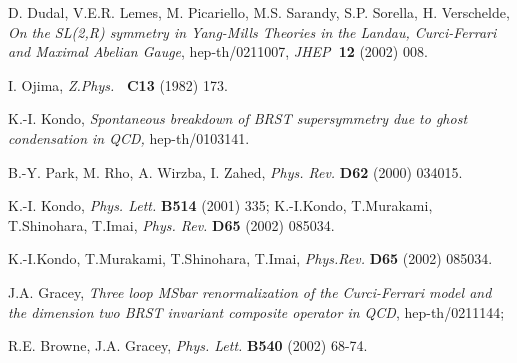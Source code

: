 \documentclass[a4paper,12pt]{article}
\begin{document}
\begin{thebibliography}{99}
  D. Dudal, V.E.R. Lemes, M. Picariello, M.S. Sarandy, S.P.
Sorella, H. Verschelde, \emph{On the SL(2,R) symmetry in Yang-Mills Theories
in the Landau, Curci-Ferrari and Maximal Abelian Gauge}, hep-th/0211007, 
\emph{JHEP}\textbf{\ 12 }(2002) 008.

  I. Ojima, \emph{Z.Phys. }\textbf{\ C13} (1982) 173.

  K.-I. Kondo, \emph{Spontaneous breakdown of BRST supersymmetry
due to ghost condensation in QCD, }hep-th/0103141.

  B.-Y. Park, M. Rho, A. Wirzba, I. Zahed, \emph{Phys. Rev. }%
\textbf{D62} (2000) 034015.

  K.-I. Kondo, \emph{Phys. Lett.} \textbf{B514} (2001) 335;
K.-I.Kondo, T.Murakami, T.Shinohara, T.Imai, \emph{Phys. Rev.} \textbf{D65}
(2002) 085034.

  K.-I.Kondo, T.Murakami, T.Shinohara, T.Imai, \emph{Phys.Rev.} 
\textbf{D65} (2002) 085034.

  J.A. Gracey, \emph{Three loop MSbar renormalization of the
Curci-Ferrari model and the dimension two BRST invariant composite operator
in QCD}, hep-th/0211144;

R.E. Browne, J.A. Gracey, \emph{Phys. Lett.} \textbf{B540} (2002) 68-74.
\end{thebibliography}
\end{document}
